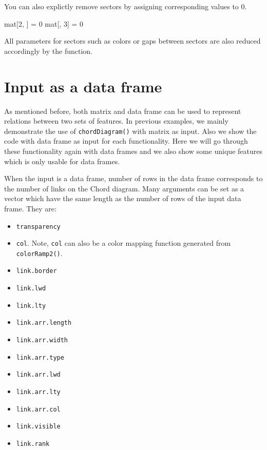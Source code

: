 \documentclass[]{book}
\newenvironment{Shaded}{\begin{snugshade}}{\end{snugshade}}
\newcommand{\DecValTok}[1]{\textcolor[rgb]{0.00,0.00,0.81}{#1}}
\newcommand{\StringTok}[1]{\textcolor[rgb]{0.31,0.60,0.02}{#1}}
\newcommand{\NormalTok}[1]{#1}
\providecommand{\tightlist}{%
  \setlength{\itemsep}{0pt}\setlength{\parskip}{0pt}}
\begin{document}
You can also explictly remove sectors by assigning corresponding values
to 0.

\begin{Shaded}
\begin{Highlighting}[]
\NormalTok{mat[}\DecValTok{2}\NormalTok{, ] =}\StringTok{ }\DecValTok{0}
\NormalTok{mat[, }\DecValTok{3}\NormalTok{] =}\StringTok{ }\DecValTok{0}
\end{Highlighting}
\end{Shaded}

All parameters for sectors such as colors or gaps between sectors are
also reduced accordingly by the function.

\section{Input as a data frame}\label{input-as-a-data-frame}

As mentioned before, both matrix and data frame can be used to represent
relations between two sets of features. In previous examples, we mainly
demonstrate the use of \texttt{chordDiagram()} with matrix as input.
Also we show the code with data frame as input for each functionality.
Here we will go through these functionality again with data frames and
we also show some unique features which is only usable for data frames.

When the input is a data frame, number of rows in the data frame
corresponds to the number of links on the Chord diagram. Many arguments
can be set as a vector which have the same length as the number of rows
of the input data frame. They are:

\begin{itemize}
\tightlist
\item
  \texttt{transparency}
\item
  \texttt{col}. Note, \texttt{col} can also be a color mapping function
  generated from \texttt{colorRamp2()}.
\item
  \texttt{link.border}
\item
  \texttt{link.lwd}
\item
  \texttt{link.lty}
\item
  \texttt{link.arr.length}
\item
  \texttt{link.arr.width}
\item
  \texttt{link.arr.type}
\item
  \texttt{link.arr.lwd}
\item
  \texttt{link.arr.lty}
\item
  \texttt{link.arr.col}
\item
  \texttt{link.visible}
\item
  \texttt{link.rank}
\end{itemize}
\end{document}
